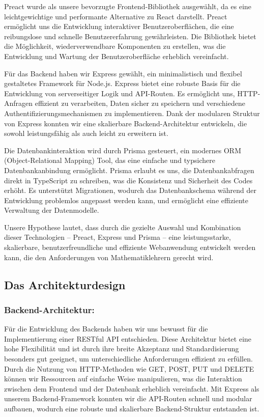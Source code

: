 \documentclass[12pt,a4paper]{scrartcl} %
\begin{document}
Preact wurde als unsere bevorzugte Frontend-Bibliothek ausgewählt, da es eine leichtgewichtige und performante Alternative zu React darstellt. Preact ermöglicht uns die Entwicklung interaktiver Benutzeroberflächen, die eine reibungslose und schnelle Benutzererfahrung gewährleisten. Die Bibliothek bietet die Möglichkeit, wiederverwendbare Komponenten zu erstellen, was die Entwicklung und Wartung der Benutzeroberfläche erheblich vereinfacht.

Für das Backend haben wir Express gewählt, ein minimalistisch und flexibel gestaltetes Framework für Node.js. Express bietet eine robuste Basis für die Entwicklung von serverseitiger Logik und API-Routen. Es ermöglicht uns, HTTP-Anfragen effizient zu verarbeiten, Daten sicher zu speichern und verschiedene Authentifizierungsmechanismen zu implementieren. Dank der modularen Struktur von Express konnten wir eine skalierbare Backend-Architektur entwickeln, die sowohl leistungsfähig als auch leicht zu erweitern ist.

Die Datenbankinteraktion wird durch Prisma gesteuert, ein modernes ORM (Object-Relational Mapping) Tool, das eine einfache und typsichere Datenbankanbindung ermöglicht. Prisma erlaubt es uns, die Datenbankabfragen direkt in TypeScript zu schreiben, was die Konsistenz und Sicherheit des Codes erhöht. Es unterstützt Migrationen, wodurch das Datenbankschema während der Entwicklung problemlos angepasst werden kann, und ermöglicht eine effiziente Verwaltung der Datenmodelle.

Unsere Hypothese lautet, dass durch die gezielte Auswahl und Kombination dieser Technologien – Preact, Express und Prisma – eine leistungsstarke, skalierbare, benutzerfreundliche und effiziente Webanwendung entwickelt werden kann, die den Anforderungen von Mathematiklehrern gerecht wird.

\subsection{Das Architekturdesign}

\subsubsection{Backend-Architektur:} 

Für die Entwicklung des Backends haben wir uns bewusst für die Implementierung einer RESTful API entschieden. Diese Architektur bietet eine hohe Flexibilität und ist durch ihre breite Akzeptanz und Standardisierung besonders gut geeignet, um unterschiedliche Anforderungen effizient zu erfüllen. Durch die Nutzung von HTTP-Methoden wie GET, POST, PUT und DELETE können wir Ressourcen auf einfache Weise manipulieren, was die Interaktion zwischen dem Frontend und der Datenbank erheblich vereinfacht. Mit Express als unserem Backend-Framework konnten wir die API-Routen schnell und modular aufbauen, wodurch eine robuste und skalierbare Backend-Struktur entstanden ist.
\end{document}
